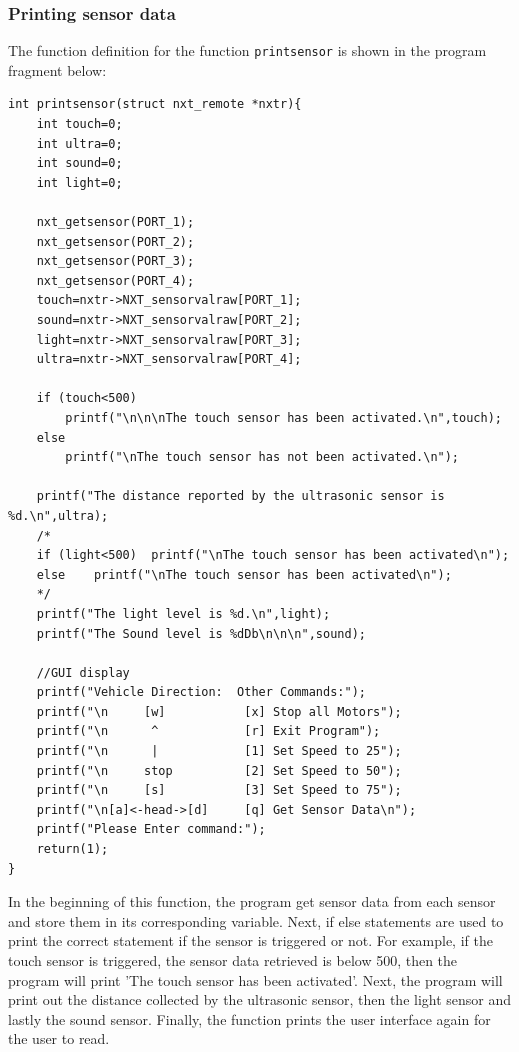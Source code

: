 \documentclass[12pt]{article}
\begin{document}
\subsubsection*{Printing sensor data}
The function definition for the function \verb+printsensor+ is shown in the program fragment below:
\begin{verbatim}
int printsensor(struct nxt_remote *nxtr){
    int touch=0;
    int ultra=0;
    int sound=0;
    int light=0;

    nxt_getsensor(PORT_1);
    nxt_getsensor(PORT_2);
    nxt_getsensor(PORT_3);
    nxt_getsensor(PORT_4);
    touch=nxtr->NXT_sensorvalraw[PORT_1];
    sound=nxtr->NXT_sensorvalraw[PORT_2];
    light=nxtr->NXT_sensorvalraw[PORT_3];
    ultra=nxtr->NXT_sensorvalraw[PORT_4];

    if (touch<500)
        printf("\n\n\nThe touch sensor has been activated.\n",touch);
    else
        printf("\nThe touch sensor has not been activated.\n");
    
    printf("The distance reported by the ultrasonic sensor is %d.\n",ultra);
    /*
    if (light<500)  printf("\nThe touch sensor has been activated\n");
    else    printf("\nThe touch sensor has been activated\n");
    */
    printf("The light level is %d.\n",light);
    printf("The Sound level is %dDb\n\n\n",sound);
    
    //GUI display
    printf("Vehicle Direction:  Other Commands:");
    printf("\n     [w]           [x] Stop all Motors");
    printf("\n      ^            [r] Exit Program");
    printf("\n      |            [1] Set Speed to 25");
    printf("\n     stop          [2] Set Speed to 50");
    printf("\n     [s]           [3] Set Speed to 75");
    printf("\n[a]<-head->[d]     [q] Get Sensor Data\n");
    printf("Please Enter command:");
    return(1);
}
\end{verbatim}
In the beginning of this function, the program get sensor data from each sensor and store them in its corresponding
    variable.
Next, if else statements are used to print the correct statement if the sensor is triggered or not.
For example, if the touch sensor is triggered, the sensor data retrieved is below 500, then the program will
    print 'The touch sensor has been activated'.
Next, the program will print out the distance collected by the ultrasonic sensor, then the light sensor and lastly
    the sound sensor.
Finally, the function prints the user interface again for the user to read.

\newpage
\end{document}
